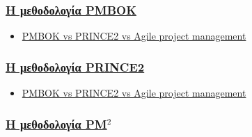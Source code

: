 \documentclass[12pt]{turabian-researchpaper}
\begin{document}
\subsubsection{\texorpdfstring{\hyperref[comparison_pmbok]{Η μεθοδολογία PMBOK}}{}}
\begin{itemize}[itemsep=0pt]
    \item \href{https://www2.cio.com.au/article/402347/pmbok_vs_prince2_vs_agile_project_management/}{PMBOK vs PRINCE2 vs Agile project management}
\end{itemize}

\subsubsection{\texorpdfstring{\hyperref[comparison_prince2]{Η μεθοδολογία PRINCE2}}{}}
\begin{itemize}[itemsep=0pt]
    \item \href{https://www2.cio.com.au/article/402347/pmbok_vs_prince2_vs_agile_project_management/}{PMBOK vs PRINCE2 vs Agile project management}
\end{itemize}

\subsubsection{\texorpdfstring{\hyperref[comparison_pm2]{Η μεθοδολογία PM\texorpdfstring{$^2$}{}}}{}}
\end{document}

